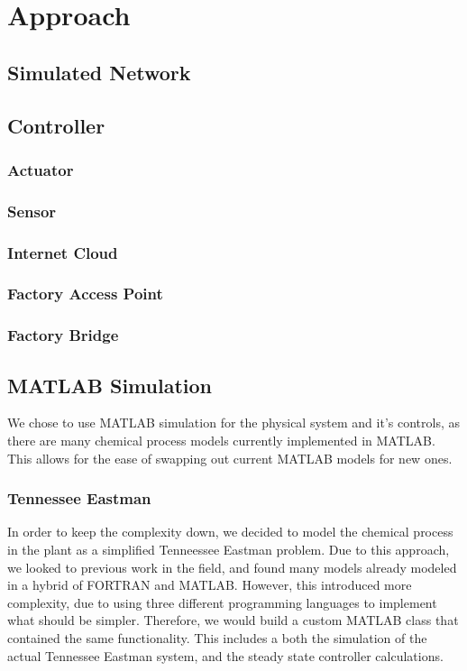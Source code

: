 \section{Approach}
\subsection{Simulated Network}

\subsection{Controller}

\subsubsection{Actuator}

\subsubsection{Sensor}

\subsubsection{Internet Cloud}

\subsubsection{Factory Access Point}

\subsubsection{Factory Bridge}

\subsection{MATLAB Simulation}
  We chose to use MATLAB simulation for the physical system and it's controls, 
  as there are many chemical process models currently implemented in MATLAB.
  This allows for the ease of swapping out current MATLAB models for new ones.

\subsubsection{Tennessee Eastman}
  In order to keep the complexity down, we decided to model the chemical process
  in the plant as a simplified Tenneessee Eastman problem. 
  Due to this approach, we looked to previous work in the field, and found many
  models already modeled in a hybrid of FORTRAN and MATLAB.  However, this 
  introduced more complexity, due to using three different programming languages
  to implement what should be simpler.  Therefore, we would build a custom
  MATLAB class that contained the same functionality.  This includes a both the
  simulation of the actual Tennessee Eastman system, and the steady state 
  controller calculations.

